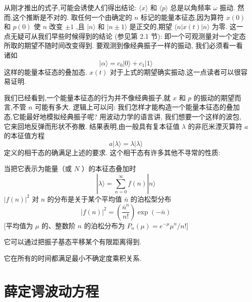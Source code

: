 从刚才推出的式子,可能会诱使人们得出结论: $\langle x\rangle$ 和 $\langle p\rangle$ 总是以角频率 $\omega$ 振动. 然而,这个推断是不对的. 取任何一个由确定的 $n$ 标记的能量本征态,因为算符 $x\left( 0\right)$ 和 $p\left( 0\right)$ 使 $n$ 改变 $\pm 1$ ,且 $|n\rangle$ 和 $|n \pm 1\rangle$ 是正交的,期望 $\langle n | x\left( t\right) | n\rangle$ 为零. 这一点无疑可从我们早些时候得到的结论 (参见第 2.1 节): 即一个可观测量对一个定态所取的期望不随时间改变得到. 要观测到像经典振子一样的振动, 我们必须看一看诸如
\begin{equation}
|\alpha \rangle = {c}_{0}\left| {0\rangle + {c}_{1}}\right| 1\rangle
\end{equation}
这样的能量本征态的叠加态. $x\left( t\right)$ 对于上式的期望确实振动,这一点读者可以很容易证明.

我们已经看到,一个能量本征态的行为并不像经典振子,就 $x$ 和 $p$ 的振动的期望而言,不管 $n$ 可能有多大. 逻辑上可以问: 我们怎样才能构造一个能量本征态的叠加态,它能最好地模拟经典振子呢? 用波动力学的语言讲, 我们想要一个这样的波包, 它来回地反弹而形状不弥散. 结果表明,由一般具有复本征值 $\lambda$ 的非厄米湮灭算符 $a$ 的本征值方程
\begin{equation}
a\left| {\lambda \rangle = \lambda }\right| \lambda \rangle 
\end{equation}
定义的相干态的确满足上述的要求. 这个相干态有许多其他不寻常的性质:
\begin{property}
当把它表示为能量（或 $N$ ）的本征态叠加时
\begin{equation}
	| {\lambda \rangle = \mathop{\sum }\limits_{{n = 0}}^{\infty }f\left( n\right) }| n\rangle
\end{equation}
${\left| f\left( n\right) \right| }^{2}$ 对 $n$ 的分布是关于某个平均值 $\bar{n}$ 的泊松型分布
\begin{equation}
	{\left| f\left( n\right) \right| }^{2} = \left( \frac{{\bar{n}}^{n}}{n!}\right) \exp \left( {-\bar{n}}\right)
\end{equation}
[平均值为 $\mu$ 的、整数阶 $n$ 的泊松分布为 ${P}_{n}\left( \mu \right) = {e}^{-\mu }{\mu }^{n}/n!$]
\end{property}
\begin{property}
它可以通过把振子基态平移某个有限距离得到.
\end{property}
\begin{property}
它在所有的时间都满足最小不确定度乘积关系.
\end{property}
\section{薛定谔波动方程}
